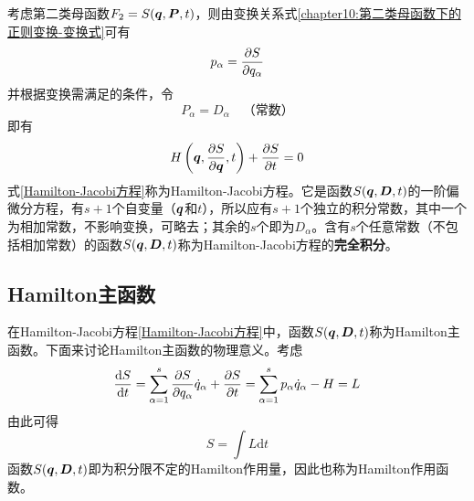 考虑第二类母函数$F_2 = S(\boldsymbol{q},\boldsymbol{P},t)$，则由变换关系式\eqref{chapter10:第二类母函数下的正则变换-变换式}可有
\begin{equation}
	p_\alpha = \frac{\partial S}{\partial q_\alpha}
	\label{chapter10:Hamilton-Jacobi方程-动量与Hamilton主函数之间的关系}
\end{equation}
并根据变换需满足的条件，令
\begin{equation}
	P_\alpha = D_\alpha\quad \text{（常数）}
\end{equation}
即有
\begin{equation}
	H\left(\boldsymbol{q},\frac{\partial S}{\partial \boldsymbol{q}},t\right) + \frac{\partial S}{\partial t} = 0
	\label{Hamilton-Jacobi方程}
\end{equation}
式\eqref{Hamilton-Jacobi方程}称为{\heiti Hamilton-Jacobi方程}。它是函数$S(\boldsymbol{q},\boldsymbol{D},t)$的一阶偏微分方程，有$s+1$个自变量（$\boldsymbol{q}$和$t$），所以应有$s+1$个独立的积分常数，其中一个为相加常数，不影响变换，可略去；其余的$s$个即为$D_\alpha$。含有$s$个任意常数（不包括相加常数）的函数$S(\boldsymbol{q},\boldsymbol{D},t)$称为Hamilton-Jacobi方程的{\bf 完全积分}。

\subsection{Hamilton主函数}

在Hamilton-Jacobi方程\eqref{Hamilton-Jacobi方程}中，函数$S(\boldsymbol{q},\boldsymbol{D},t)$称为{\heiti Hamilton主函数}。下面来讨论Hamilton主函数的物理意义。考虑
\begin{equation}
	\frac{\mathrm{d} S}{\mathrm{d} t} = \sum_{\alpha=1}^s \frac{\partial S}{\partial q_\alpha} \dot{q}_\alpha + \frac{\partial S}{\partial t} = \sum_{\alpha=1}^s p_\alpha \dot{q}_\alpha - H = L
\end{equation}
由此可得
\begin{equation}
	S = \int L \mathrm{d} t
	\label{Hamilton作用函数}
\end{equation}
函数$S(\boldsymbol{q},\boldsymbol{D},t)$即为积分限不定的Hamilton作用量，因此也称为{\heiti Hamilton作用函数}。

